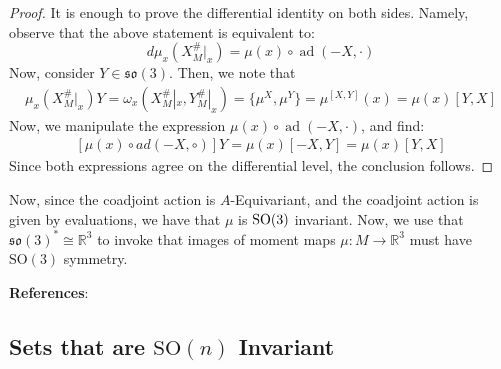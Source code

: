 \begin{proof}
It is enough to prove the differential identity on both sides. Namely, observe that the above statement is equivalent to:
$$d \mu_{x} (X^{\#}_{M}|_{x}) =  \mu(x) \circ \operatorname{ad}(-X, \cdot)$$
Now, consider $Y \in \mathfrak{so}(3)$. Then, we note that 
\begin{align}
\mu_{x} (X^{\#}_{M}|_{x}) Y = \omega_{x}(X^{\#}_{M}|_{x}, Y^{\#}_{M}|_{x}) = \{\mu^X, \mu^Y \} = \mu^{[X,Y]}(x) = \mu(x)[Y, X]
\end{align}
Now, we manipulate the expression $\mu(x) \circ \operatorname{ad}(-X, \cdot)$, and find: 
\begin{align}
\left[ \mu(x) \circ ad(-X, \circ) \right] Y = \mu(x)[-X,Y] = \mu(x)[Y,X]
\end{align}
Since both expressions agree on the differential level, the conclusion follows. 
\end{proof}

Now, since the coadjoint action is $A$-Equivariant, and the coadjoint action is given by evaluations, we have that $\mu$ is $\rm{SO}(3)$ invariant. Now, we use that $\mathfrak{so}(3)^{*} \cong \mathbb{R}^{3}$ to invoke that images of moment maps $\mu: M \to \mathbb{R}^{3}$ must have $\mathrm{SO}(3)$ symmetry. \bigskip  

\noindent \textbf{References}: \textcite{Terek2020}

\subsection{Sets that are $\mathrm{SO}(n)$ Invariant}

